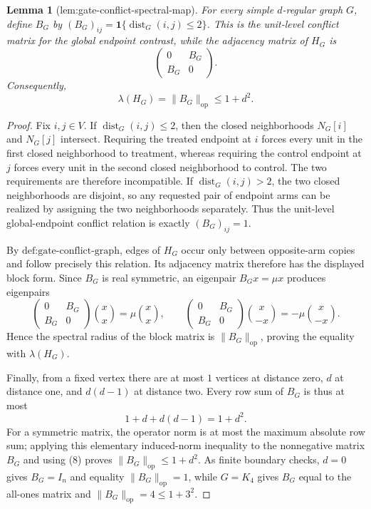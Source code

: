 \documentclass{article}
\newtheorem{lemma}{Lemma}
\begin{document}
\begin{lemma}[lem:gate-conflict-spectral-map]\label{lem:gate-conflict-spectral-map}
For every simple \(d\)-regular graph \(G\), define \(B_G\) by \((B_G)_{ij}=\mathbf 1\{\operatorname{dist}_G(i,j)\le2\}\).  This is the unit-level conflict matrix for the global endpoint contrast, while the adjacency matrix of \(H_G\) is
\[
\begin{pmatrix}0&B_G\\B_G&0\end{pmatrix}.
\]
Consequently,
\[
\lambda(H_G)=\|B_G\|_{\mathrm{op}}\le1+d^2.
\]
\end{lemma}
\begin{proof}
Fix \(i,j\in V\).  If \(\operatorname{dist}_G(i,j)\le2\), then the closed neighborhoods \(N_G[i]\) and \(N_G[j]\) intersect.  Requiring the treated endpoint at \(i\) forces every unit in the first closed neighborhood to treatment, whereas requiring the control endpoint at \(j\) forces every unit in the second closed neighborhood to control.  The two requirements are therefore incompatible.  If \(\operatorname{dist}_G(i,j)>2\), the two closed neighborhoods are disjoint, so any requested pair of endpoint arms can be realized by assigning the two neighborhoods separately.  Thus the unit-level global-endpoint conflict relation is exactly \((B_G)_{ij}=1\).

By \(\text{def:gate-conflict-graph}\), edges of \(H_G\) occur only between opposite-arm copies and follow precisely this relation.  Its adjacency matrix therefore has the displayed block form.  Since \(B_G\) is real symmetric, an eigenpair \(B_Gx=\mu x\) produces eigenpairs
\[
\begin{pmatrix}0&B_G\\B_G&0\end{pmatrix}
\binom{x}{x}=\mu\binom{x}{x},
\qquad
\begin{pmatrix}0&B_G\\B_G&0\end{pmatrix}
\binom{x}{-x}=-\mu\binom{x}{-x}.
\]
Hence the spectral radius of the block matrix is \(\|B_G\|_{\mathrm{op}}\), proving the equality with \(\lambda(H_G)\).

Finally, from a fixed vertex there are at most \(1\) vertices at distance zero, \(d\) at distance one, and \(d(d-1)\) at distance two.  Every row sum of \(B_G\) is thus at most
\[
1+d+d(d-1)=1+d^2. \tag{8}
\]
For a symmetric matrix, the operator norm is at most the maximum absolute row sum; applying this elementary induced-norm inequality to the nonnegative matrix \(B_G\) and using (8) proves \(\|B_G\|_{\mathrm{op}}\le1+d^2\).  As finite boundary checks, \(d=0\) gives \(B_G=I_n\) and equality \(\|B_G\|_{\mathrm{op}}=1\), while \(G=K_4\) gives \(B_G\) equal to the all-ones matrix and \(\|B_G\|_{\mathrm{op}}=4\le1+3^2\).
\end{proof}
\end{document}
